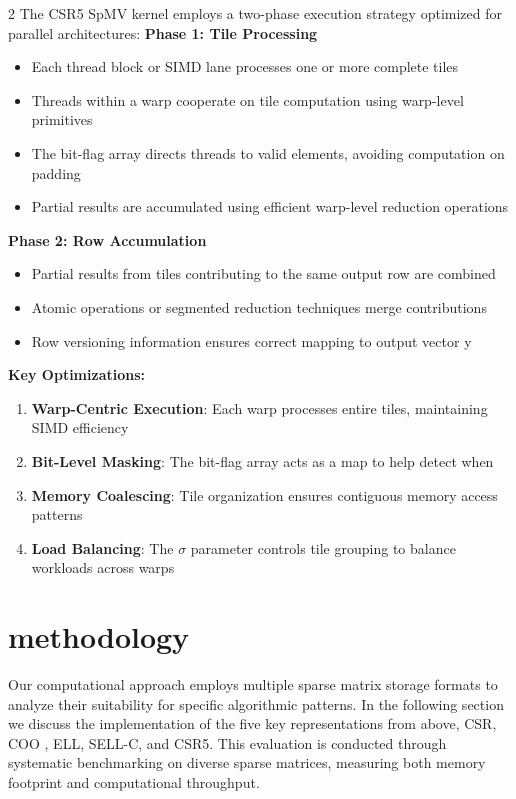 \documentclass{article}
\begin{document}
\begin{multicols}{2}
The CSR5 SpMV kernel employs a two-phase execution strategy optimized for parallel architectures:
\textbf{Phase 1: Tile Processing}
\begin{itemize}
\item Each thread block or SIMD lane processes one or more complete tiles
\item Threads within a warp cooperate on tile computation using warp-level primitives
\item The bit-flag array directs threads to valid elements, avoiding computation on padding
\item Partial results are accumulated using efficient warp-level reduction operations
\end{itemize}
\textbf{Phase 2: Row Accumulation}
\begin{itemize}
\item Partial results from tiles contributing to the same output row are combined
\item Atomic operations or segmented reduction techniques merge contributions
\item Row versioning information ensures correct mapping to output vector y
\end{itemize}
\textbf{Key Optimizations:}
\begin{enumerate}
\item \textbf{Warp-Centric Execution}: Each warp processes entire tiles, maintaining SIMD efficiency
\item \textbf{Bit-Level Masking}: The bit-flag array acts as a map to help detect when 
\item \textbf{Memory Coalescing}: Tile organization ensures contiguous memory access patterns
\item \textbf{Load Balancing}: The $\sigma$ parameter controls tile grouping to balance workloads across warps
\end{enumerate}


\section{methodology}


Our computational approach employs multiple sparse matrix storage formats to analyze their suitability for specific algorithmic patterns. In the following section we discuss the implementation of the five key representations from above, CSR, COO , ELL, SELL-C, and CSR5. This evaluation is conducted through systematic benchmarking on diverse sparse matrices, measuring both memory footprint and computational throughput.



\end{multicols}
\end{document}
